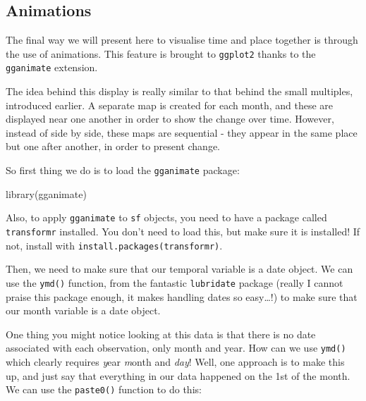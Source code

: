 \documentclass[
]{book}
\newenvironment{Shaded}{\begin{snugshade}}{\end{snugshade}}
\newcommand{\FunctionTok}[1]{\textcolor[rgb]{0.00,0.00,0.00}{#1}}
\newcommand{\NormalTok}[1]{#1}
\newcommand{\OtherTok}[1]{\textcolor[rgb]{0.56,0.35,0.01}{#1}}
\newcommand{\SpecialCharTok}[1]{\textcolor[rgb]{0.00,0.00,0.00}{#1}}
\newcommand{\StringTok}[1]{\textcolor[rgb]{0.31,0.60,0.02}{#1}}
\begin{document}
\hypertarget{animations}{%
\subsection{Animations}\label{animations}}

The final way we will present here to visualise time and place together is through the use of animations. This feature is brought to \texttt{ggplot2} thanks to the \texttt{gganimate} extension.

The idea behind this display is really similar to that behind the small multiples, introduced earlier. A separate map is created for each month, and these are displayed near one another in order to show the change over time. However, instead of side by side, these maps are sequential - they appear in the same place but one after another, in order to present change.

So first thing we do is to load the \texttt{gganimate} package:

\begin{Shaded}
\begin{Highlighting}[]
\FunctionTok{library}\NormalTok{(gganimate)}
\end{Highlighting}
\end{Shaded}

Also, to apply \texttt{gganimate} to \texttt{sf} objects, you need to have a package called \texttt{transformr} installed. You don't need to load this, but make sure it is installed! If not, install with \texttt{install.packages(transformr)}.

Then, we need to make sure that our temporal variable is a date object. We can use the \texttt{ymd()} function, from the fantastic \texttt{lubridate} package (really I cannot praise this package enough, it makes handling dates so easy\ldots!) to make sure that our month variable is a date object.

One thing you might notice looking at this data is that there is no date associated with each observation, only month and year. How can we use \texttt{ymd()} which clearly requires \emph{y}ear \emph{m}onth and \emph{day}! Well, one approach is to make this up, and just say that everything in our data happened on the 1st of the month. We can use the \texttt{paste0()} function to do this:

\begin{Shaded}
\end{Shaded}
\end{document}
